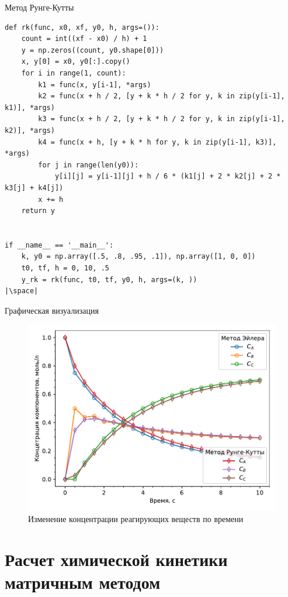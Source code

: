 \documentclass[aspectratio=169, mathserif]{beamer}	%
\begin{document}
\begin{frame}[fragile, ]{Метод Рунге-Кутты}
\scriptsize
\begin{verbatim}
def rk(func, x0, xf, y0, h, args=()):
    count = int((xf - x0) / h) + 1
    y = np.zeros((count, y0.shape[0]))
    x, y[0] = x0, y0[:].copy()
    for i in range(1, count):
        k1 = func(x, y[i-1], *args)
        k2 = func(x + h / 2, [y + k * h / 2 for y, k in zip(y[i-1], k1)], *args)
        k3 = func(x + h / 2, [y + k * h / 2 for y, k in zip(y[i-1], k2)], *args)
        k4 = func(x + h, [y + k * h for y, k in zip(y[i-1], k3)], *args)
        for j in range(len(y0)):
            y[i][j] = y[i-1][j] + h / 6 * (k1[j] + 2 * k2[j] + 2 * k3[j] + k4[j])
        x += h
    return y


if __name__ == '__main__':
    k, y0 = np.array([.5, .8, .95, .1]), np.array([1, 0, 0])
    t0, tf, h = 0, 10, .5
    y_rk = rk(func, t0, tf, y0, h, args=(k, ))
|\space|
\end{verbatim}
\vfill
\end{frame}


\begin{frame}[fragile, ]{Графическая визуализация}
\scriptsize
\begin{figure}
	\includegraphics[width=.6\textwidth]{./pics/plot}
	\caption{Изменение концентрации реагирующих веществ по времени}
\end{figure}
\end{frame}


\section{Расчет химической кинетики \\ матричным методом}
\sectionframe
\end{document}
